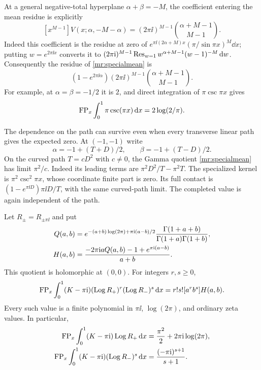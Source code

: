 At a general negative-total hyperplane $\alpha+\beta=-M$, the
coefficient entering the mean residue is explicitly
\begin{equation}\label{mr:residuepoly}
 [x^{M-1}]V(x;\alpha,-M-\alpha)
          =(2\pi\ii)^{M-1}\binom{\alpha+M-1}{M-1}.
\end{equation}
Indeed this coefficient is the residue at zero of
$e^{\pi\ii(2\alpha+M)x}(\pi/\sin\pi x)^M\dd x$; putting
$w=e^{2\pi\ii x}$ converts it to
$(2\pi\mathrm i)^{M-1}\operatorname{Res}_{w=1}w^{\alpha+M-1}(w-1)^{-M}\,\mathrm d w$.
Consequently the residue of \eqref{mr:specialmean} is
\[
 (1-e^{2\pi\ii\alpha})(2\pi\ii)^{M-1}
                              \binom{\alpha+M-1}{M-1}.
\]
For example, at $\alpha=\beta=-1/2$ it is $2$, and direct
integration of $\pi\csc\pi x$ gives
\begin{equation}\label{mr:cscfp}
               \operatorname{FP}_x\int_0^1\pi\csc(\pi x)\,\mathrm d x
                             =2\log(2/\pi).
\end{equation}

The dependence on the path can survive even when every transverse
linear path gives the expected zero. At $(-1,-1)$ write
\[
 \alpha=-1+(T+D)/2,\qquad \beta=-1+(T-D)/2.
\]
On the curved path $T=cD^2$ with $c\ne0$, the Gamma quotient
\eqref{mr:specialmean} has limit $\pi^2/c$. Indeed its leading terms
are $\pi^2D^2/T-\pi^2T$. The specialized kernel is
$\pi^2\csc^2\pi x$, whose coordinate finite part is zero.
Its full contact is
$(1-e^{\pi\ii D})\pi\ii D/T$, with the same curved-path limit.
The completed value is again independent of the path.

\begin{corollary}
\label{mr:negativeLog}
Let $R_\pm=R_{\pm\pi\ii}$ and put
\begin{align}
 Q(a,b)&=e^{-(a+b)\log(2\pi)+\pi\mathrm i(a-b)/2}
              \frac{\Gamma(1+a+b)}{\Gamma(1+a)\Gamma(1+b)},\notag\\
 H(a,b)&=\frac{-2\pi\mathrm i aQ(a,b)-1+e^{\pi\mathrm i(a-b)}}{a+b}.
       \label{mr:negativeLoggerm}
\end{align}
This quotient is holomorphic at $(0,0)$. For integers $r,s\ge0$,
\begin{equation}\label{mr:negativeLogmoment}
 \operatorname{FP}_x\int_0^1(K-\pi\mathrm i)(\operatorname{Log} R_+)^r(\operatorname{Log} R_-)^s\,\mathrm d x
                      =r!s![a^rb^s]H(a,b).
\end{equation}
Every such value is a finite polynomial in $\pi\ii$, $\log(2\pi)$,
and ordinary zeta values. In particular,
\begin{align}
 \operatorname{FP}_x\int_0^1(K-\pi\mathrm i)\operatorname{Log} R_+\,\mathrm d x
       &=\frac{\pi^2}{2}+2\pi\mathrm i\log(2\pi),\notag\\
 \operatorname{FP}_x\int_0^1(K-\pi\mathrm i)(\operatorname{Log} R_-)^s\,\mathrm d x
       &=\frac{(-\pi\mathrm i)^{s+1}}{s+1}.
       \label{mr:negativeLogexamples}
\end{align}
\end{corollary}

